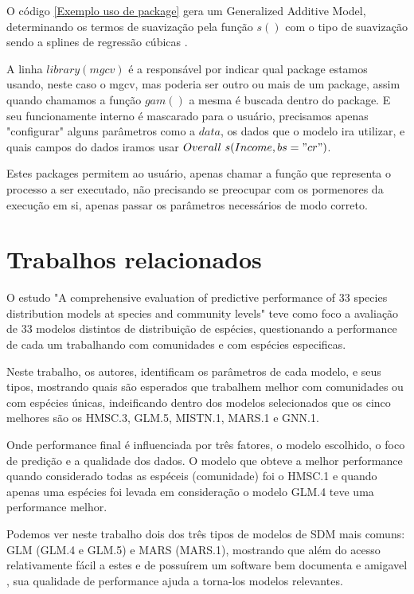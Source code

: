 \documentclass[
	12pt,				%
	openright,			%
	oneside,			%
	a4paper,			%
	english,			%
	brazil				%
	]{abntex2}
\begin{document}
O código \ref{Exemplo uso de package} gera um Generalized Additive Model, determinando os termos de suavização pela função $s()$ com o
tipo de suavização sendo a splines de regressão cúbicas \cite{gam_exemplo}. 

A linha $library(mgcv)$ é a responsável por indicar qual package estamos usando, neste caso o mgcv, mas poderia ser outro ou mais 
de um package, assim quando chamamos a função $gam()$ a mesma é buscada dentro do package. E seu funcionamente interno é mascarado 
para o usuário, precisamos apenas "configurar" alguns parâmetros como a $data$, os dados que o modelo ira utilizar, e quais campos 
do dados iramos usar $Overall ~ s(Income, bs = "cr")$.  

Estes packages permitem ao usuário, apenas chamar a função que representa o processo a ser executado, não precisando se preocupar com
os pormenores da execução em si, apenas passar os parâmetros necessários de modo correto.

\section{Trabalhos relacionados}

O estudo "A comprehensive evaluation of predictive performance of 33 species distribution models at species and community levels"
\cite{predPerform33models} teve como foco a avaliação de 33 modelos distintos de distribuição de espécies, questionando a
performance de cada um trabalhando com comunidades e com espécies especificas.

Neste trabalho, os autores, identificam os parâmetros de cada modelo, e seus tipos, mostrando quais são esperados que trabalhem melhor
com comunidades ou com espécies únicas, indeificando dentro dos modelos selecionados que os cinco melhores são os HMSC.3, GLM.5,
MISTN.1, MARS.1 e GNN.1.

Onde performance final é influenciada por três fatores, o modelo escolhido, o foco de predição e a qualidade dos dados. O modelo
que obteve a melhor performance quando considerado todas as espéceis (comunidade) foi o HMSC.1 e quando apenas uma 
espécies foi levada em consideração o modelo GLM.4 teve uma performance melhor.

Podemos ver neste trabalho dois dos três tipos de modelos de SDM mais comuns: GLM (GLM.4 e GLM.5) e MARS (MARS.1), mostrando que
além do acesso relativamente fácil a estes e de possuírem um software bem documenta e amigavel \cite{predPerform33models}, sua 
qualidade de performance ajuda a torna-los modelos relevantes.
\end{document}

